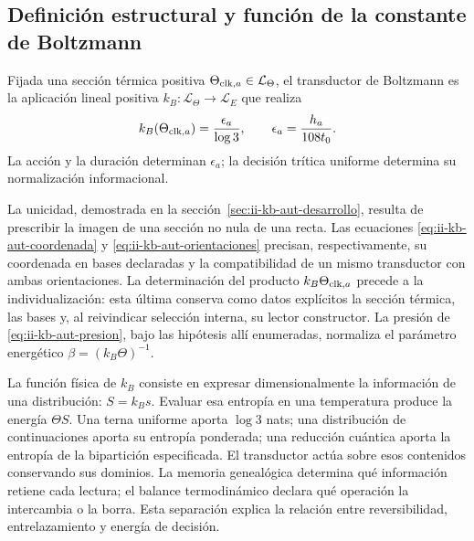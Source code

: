 \subsection{Definición estructural y función de la constante de Boltzmann}
\label{sec:ii-definicion-boltzmann}

\begin{definition}
Fijada una sección térmica positiva
\(\Theta_{{\rm clk},a}\in\mathcal L_\Theta\), el transductor
de Boltzmann es la aplicación lineal positiva
\(k_B:\mathcal L_\Theta\to\mathcal L_E\) que realiza
\begin{equation}
 k_B(\Theta_{{\rm clk},a})
 =\frac{\epsilon_a}{\log3},
 \qquad \epsilon_a=\frac{h_a}{108t_0}.
 \label{eq:ii-definicion-boltzmann-transductor}
\end{equation}
La acción y la duración determinan \(\epsilon_a\); la decisión
trítica uniforme determina su normalización informacional.
\end{definition}

La unicidad, demostrada en la sección~\ref{sec:ii-kb-aut-desarrollo},
resulta de prescribir la imagen de una sección no nula de una recta.
Las ecuaciones \eqref{eq:ii-kb-aut-coordenada} y
\eqref{eq:ii-kb-aut-orientaciones} precisan, respectivamente, su
coordenada en bases declaradas y la compatibilidad de un mismo
transductor con ambas orientaciones. La determinación del producto
\(k_B\Theta_{{\rm clk},a}\) precede a la individualización:
esta última conserva como datos explícitos la sección térmica, las
bases y, al reivindicar selección interna, su lector constructor.
La presión de \eqref{eq:ii-kb-aut-presion}, bajo las hipótesis
allí enumeradas, normaliza el parámetro energético
\(\beta=(k_B\Theta)^{-1}\).

La función física de \(k_B\) consiste en expresar dimensionalmente
la información de una distribución: \(S=k_Bs\). Evaluar esa
entropía en una temperatura produce la energía \(\Theta S\).
Una terna uniforme aporta \(\log3\) nats; una distribución de
continuaciones aporta su entropía ponderada; una reducción cuántica
aporta la entropía de la bipartición especificada. El transductor
actúa sobre esos contenidos conservando sus dominios. La memoria
genealógica determina qué información retiene cada lectura; el
balance termodinámico declara qué operación la intercambia o la
borra. Esta separación explica la relación entre reversibilidad,
entrelazamiento y energía de decisión.
